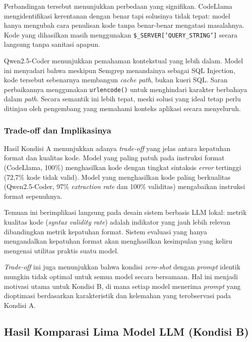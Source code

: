 Perbandingan tersebut menunjukkan perbedaan yang signifikan. CodeLlama mengidentifikasi kerentanan dengan benar tapi solusinya tidak tepat: model hanya mengubah cara penulisan kode tanpa benar-benar mengatasi masalahnya. Kode yang dihasilkan masih menggunakan \texttt{\$\_SERVER['QUERY\_STRING']} secara langsung tanpa sanitasi apapun.

Qwen2.5-Coder menunjukkan pemahaman kontekstual yang lebih dalam. Model ini menyadari bahwa meskipun Semgrep menandainya sebagai SQL Injection, kode tersebut sebenarnya membangun \textit{cache path}, bukan kueri SQL. Saran perbaikannya menggunakan \texttt{urlencode()} untuk menghindari karakter berbahaya dalam \textit{path}. Secara semantik ini lebih tepat, meski solusi yang ideal tetap perlu ditinjau oleh pengembang yang memahami konteks aplikasi secara menyeluruh.

\subsubsection{Trade-off dan Implikasinya}

Hasil Kondisi A menunjukkan adanya \textit{trade-off} yang jelas antara kepatuhan format dan kualitas kode. Model yang paling patuh pada instruksi format (CodeLlama, 100\%) menghasilkan kode dengan tingkat sintaksis \textit{error} tertinggi (72,7\% kode tidak valid). Model yang menghasilkan kode paling berkualitas (Qwen2.5-Coder, 97\% \textit{extraction rate} dan 100\% validitas) mengabaikan instruksi format sepenuhnya.

Temuan ini berimplikasi langsung pada desain sistem berbasis LLM lokal: metrik kualitas kode (\textit{syntax validity rate}) adalah indikator yang jauh lebih relevan dibandingkan metrik kepatuhan format. Sistem evaluasi yang hanya mengandalkan kepatuhan format akan menghasilkan kesimpulan yang keliru mengenai utilitas praktis suatu model.

\textit{Trade-off} ini juga menunjukkan bahwa kondisi \textit{zero-shot} dengan \textit{prompt} identik mungkin tidak optimal untuk semua model secara bersamaan. Hal ini menjadi motivasi utama untuk Kondisi B, di mana setiap model menerima \textit{prompt} yang dioptimasi berdasarkan karakteristik dan kelemahan yang terobservasi pada Kondisi A.

\subsection{Hasil Komparasi Lima Model LLM (Kondisi B)}

